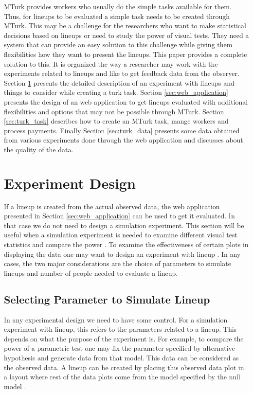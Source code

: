 \documentclass[11pt]{article}
\begin{document}
MTurk provides workers who usually do the simple tasks available for them. Thus, for lineups to be evaluated a simple task needs to be created through MTurk. This may be a challenge for the researchers who want to make statistical decisions based on lineups or need to study the power of visual tests. They need a system that can provide an easy solution to this challenge while giving them flexibilities how they want to present the lineups. This paper provides a complete solution to this. It is organized the way a researcher may work with the experiments related to lineups and like to get feedback data from the observer. Section \ref{sec:turk_exp} presents the detailed description of an experiment with lineups and things to consider while creating a turk task. Section \ref{sec:web_application} presents the design of an web application to get lineups evaluated with additional flexibilities and options that may not be possible through MTurk. Section \ref{sec:turk_task} describes how to create an MTurk task, mange workers and process payments. Finally Section \ref{sec:turk_data} presents some data obtained from various experiments done through the web application and discusses about the quality of the data.


\section{Experiment Design} \label{sec:turk_exp}

If a lineup is created from the actual observed data, the web application presented in Section \ref{sec:web_application} can be used to get it evaluated. In that case we do not need to design a simulation experiment. This section will be useful when a simulation experiment is needed to examine different visual test statistics and compare the power \citep{majumder:2013}. To examine the effectiveness of certain plots in displaying the data one may want to design an experiment with lineup \citep{heike:2012}. In any cases, the two major considerations are the choice of parameters to simulate lineups and number of people needed to evaluate a lineup.

\subsection{Selecting Parameter to Simulate Lineup} \label{sec:parameter_selection} In any experimental design we need to have some control. For a simulation experiment with lineup, this refers to the parameters related to a lineup. This depends on what the purpose of the experiment is. For example, to compare the power of a parametric test one may fix the parameter specified by alternative hypothesis and generate data from that model. This data can be considered as the observed data. A lineup can be created by placing this observed data plot in a layout where rest of the data plots come from the model specified by the null model \citep{majumder:2013}. 
\end{document}
